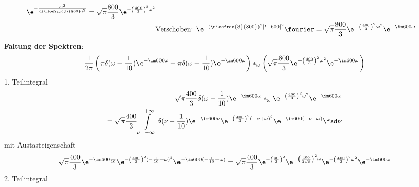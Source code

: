 \begin{ExCalc}
\begin{align}
\e^{-\frac{\omega^2}{4 \left(\nicefrac{3}{800}\right)^2}}
=\sqrt{\pi} \frac{800}{3} \e^{-\left(\frac{400}{3}\right)^2 \omega^2}\\
&\text{Verschoben: } \e^{-\left(\nicefrac{3}{800}\right)^2 [t-600]^2} \fourier
=\sqrt{\pi} \frac{800}{3} \e^{-\left(\frac{400}{3}\right)^2 \omega^2} \e^{-\im 600 \omega}
\end{align}
%
\noindent\textbf{Faltung der Spektren}:
\begin{align}
\frac{1}{2\pi} \left(\pi\delta(\omega - \frac{1}{10})\e^{-\im 600 \omega} + \pi\delta(\omega + \frac{1}{10})\e^{-\im 600 \omega}\right)
\ast_\omega
\left(\sqrt{\pi} \frac{800}{3} \e^{-\left(\frac{400}{3}\right)^2 \omega^2} \e^{-\im 600 \omega}\right)
\end{align}
1. Teilintegral
\begin{align}
\sqrt{\pi} \frac{400}{3}
\delta(\omega - \frac{1}{10})\e^{-\im 600 \omega}
\ast_\omega
\e^{-\left(\frac{400}{3}\right)^2 \omega^2} \e^{-\im 600 \omega}\nonumber\\
=\sqrt{\pi} \frac{400}{3} \int\limits_{\nu =-\infty}^{+\infty}
\delta(\nu - \frac{1}{10})\e^{-\im 600 \nu}
\e^{-\left(\frac{400}{3}\right)^2 (-\nu+\omega)^2} \e^{-\im 600 (-\nu+\omega)}\fsd \nu
\end{align}
mit Austasteigenschaft
\begin{align}
\sqrt{\pi} \frac{400}{3}
\e^{-\im 600 \frac{1}{10}}
\e^{-\left(\frac{400}{3}\right)^2 (-\frac{1}{10}+\omega)^2} \e^{-\im 600 (-\frac{1}{10}+\omega)}
=\sqrt{\pi} \frac{400}{3}
\e^{-\left(\frac{40}{3}\right)^2}
\e^{+\left(\frac{400}{3 \sqrt{5}}\right)^2 \omega}
\e^{-\left(\frac{400}{3}\right)^2 \omega^2}
 \e^{-\im 600 \omega}
\end{align}
%
%
%
2. Teilintegral
\begin{align}

\end{align}
\end{ExCalc}
